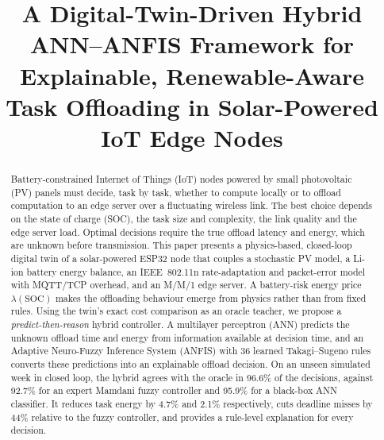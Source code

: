 \documentclass[conference]{IEEEtran}
\begin{document}
\title{A Digital-Twin-Driven Hybrid ANN--ANFIS Framework for Explainable, Renewable-Aware Task Offloading in Solar-Powered IoT Edge Nodes}

\author{
\and
{}
}

\maketitle

\begin{abstract}
Battery-constrained Internet of Things (IoT) nodes powered by small photovoltaic (PV) panels must decide, task by task, whether
to compute locally or to offload computation to an edge server over a fluctuating wireless link. The best choice depends on the
state of charge (SOC), the task size and complexity, the link quality and the edge server load. Optimal decisions require the
true offload latency and energy, which are unknown before transmission. This paper presents a physics-based, closed-loop
digital twin of a solar-powered ESP32 node that couples a stochastic PV model, a Li-ion battery energy balance, an IEEE~802.11n
rate-adaptation and packet-error model with MQTT/TCP overhead, and an M/M/1 edge server. A battery-risk energy price
$\lambda(\mathrm{SOC})$ makes the offloading behaviour emerge from physics rather than from fixed rules. Using the twin's exact
cost comparison as an oracle teacher, we propose a \emph{predict-then-reason} hybrid controller. A multilayer perceptron (ANN)
predicts the unknown offload time and energy from information available at decision time, and an Adaptive Neuro-Fuzzy Inference
System (ANFIS) with 36 learned Takagi--Sugeno rules converts these predictions into an explainable offload decision. On an unseen
simulated week in closed loop, the hybrid agrees with the oracle in 96.6\% of the decisions, against 92.7\% for an expert Mamdani
fuzzy controller and 95.9\% for a black-box ANN classifier. It reduces task energy by 4.7\% and 2.1\% respectively, cuts deadline
misses by 44\% relative to the fuzzy controller, and provides a rule-level explanation for every decision.
\end{abstract}
\end{document}
